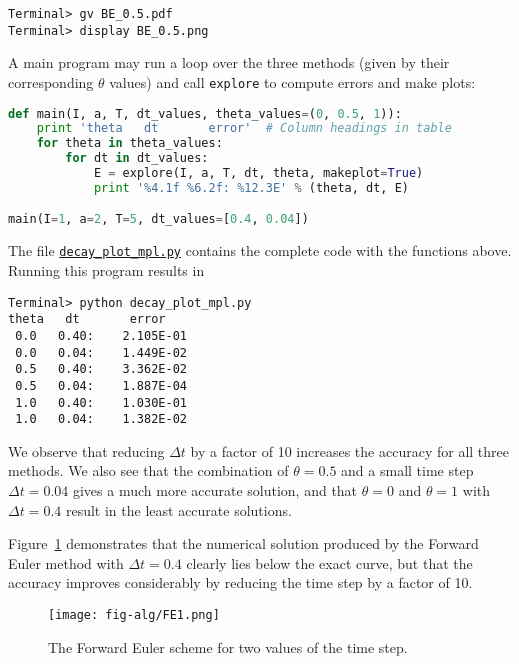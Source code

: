 \documentclass[graybox,sectrefs,envcountresetchap,open=right,final]{svmonodo}
\begin{document}
\begin{Verbatim}[frame=lines,label=\fbox{{\tiny Terminal}},framesep=2.5mm,framerule=0.7pt,fontsize=\fontsize{9pt}{9pt}]
Terminal> gv BE_0.5.pdf
Terminal> display BE_0.5.png
\end{Verbatim}

A main program may run a loop over the three methods (given by
their corresponding $\theta$ values)
and call \texttt{explore} to compute errors and make plots:

\begin{lstlisting}[language=Python,style=blue1_bluegreen]
def main(I, a, T, dt_values, theta_values=(0, 0.5, 1)):
    print 'theta   dt       error'  # Column headings in table
    for theta in theta_values:
        for dt in dt_values:
            E = explore(I, a, T, dt, theta, makeplot=True)
            print '%4.1f %6.2f: %12.3E' % (theta, dt, E)

main(I=1, a=2, T=5, dt_values=[0.4, 0.04])
\end{lstlisting}
The file \href{{http://tinyurl.com/ofkw6kc/alg/decay_plot_mpl.py}}{\nolinkurl{decay_plot_mpl.py}}
contains the complete code with the functions above.
Running this program results in

\begin{Verbatim}[frame=lines,label=\fbox{{\tiny Terminal}},framesep=2.5mm,framerule=0.7pt,fontsize=\fontsize{9pt}{9pt}]
Terminal> python decay_plot_mpl.py
theta   dt       error
 0.0   0.40:    2.105E-01
 0.0   0.04:    1.449E-02
 0.5   0.40:    3.362E-02
 0.5   0.04:    1.887E-04
 1.0   0.40:    1.030E-01
 1.0   0.04:    1.382E-02
\end{Verbatim}
We observe that reducing $\Delta t$ by a factor of 10 increases the
accuracy for all three methods. We also see that
the combination of $\theta=0.5$ and a small time step $\Delta t =0.04$
gives a much more accurate solution, and that $\theta=0$ and $\theta=1$
with $\Delta t = 0.4$ result in the least accurate solutions.

Figure~\ref{decay:fig:FE1} demonstrates that the numerical solution
produced by the Forward Euler method with
$\Delta t=0.4$ clearly lies below the exact curve, but that the
accuracy improves considerably by reducing the time step by a factor
of 10.


\begin{figure}[!ht]  %
  \centerline{\texttt{[image: fig-alg/FE1.png]}}
  \caption{
  The Forward Euler scheme for two values of the time step. \label{decay:fig:FE1}
  }
\end{figure}
\end{document}
